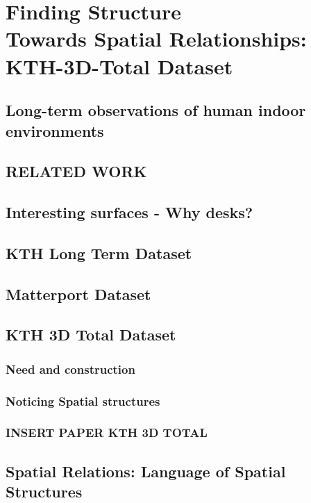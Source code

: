 \chapter[Finding Structure]{Finding Structure \\ {\Large Towards Spatial Relationships: KTH-3D-Total Dataset}}
\label{chap:FindingStructures}

\section{Long-term observations of human indoor environments}
\section{RELATED WORK}
\section{Interesting surfaces - Why desks?}
\section{KTH Long Term Dataset}
\section{Matterport Dataset}
\section{KTH 3D Total Dataset}
\subsection{Need and construction}
\subsection{Noticing Spatial structures}
\subsection{INSERT PAPER KTH 3D TOTAL}
\section{Spatial Relations: Language of Spatial Structures}

